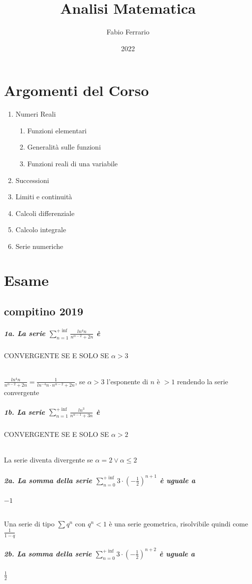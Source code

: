 \documentclass[12pt, a4paper, openany]{book}
\begin{document}
\title{Analisi Matematica}
\author{Fabio Ferrario}
\date{2022}
\maketitle
\chapter{Argomenti del Corso}

\begin{enumerate}
\item Numeri Reali
\begin{enumerate}
\item Funzioni elementari
\item Generalità sulle funzioni
\item Funzioni reali di una variabile
\end{enumerate}
\item Successioni
\item Limiti e continuità
\item Calcoli differenziale
\item Calcolo integrale
\item Serie numeriche

\end{enumerate}
\chapter{Esame}
\section{compitino 2019}
\paragraph{1a. La serie $\sum^{+\inf}_{n=1} \frac{ln^4n}{n^{\alpha - 2} + 2n}$ è} CONVERGENTE SE E SOLO SE $\alpha > 3$
\subparagraph{}
$\frac{ln^4n}{n^{\alpha - 2} + 2n} = \frac{1}{ln^{-4}n\cdot n^{\alpha-2}+2n} $,  se $\alpha >3$ l'esponente di $n$ è $>1$ rendendo la serie convergente

\paragraph{1b. La serie $\sum^{+\inf}_{n=1} \frac{ln^3}{n^{\alpha - 1} + 3n}$ è} CONVERGENTE SE E SOLO SE $\alpha > 2$
\subparagraph{} La serie diventa divergente se $\alpha = 2 \lor \alpha \leq 2$

\paragraph{2a. La somma della serie $\sum^{+\inf}_{n=0} 3\cdot (-\frac{1}{2})^{n+1}$ è uguale a} $-1$
\subparagraph{}
Una serie di tipo $\sum q^n$ con $q^n < 1$ è una serie geometrica, risolvibile quindi come $\frac{1}{1-q}$
\paragraph{2b. La somma della serie $\sum^{+\inf}_{n=0} 3\cdot (-\frac{1}{2})^{n+2}$ è uguale a} $\frac{1}{2}$
\end{document}

